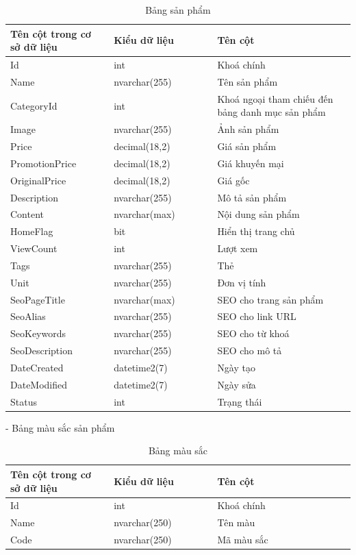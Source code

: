 \begin{longtable}[htp]{ |m{0.3\linewidth}|m{0.3\linewidth}|m{0.4\linewidth}|}
\caption{Bảng sản phẩm \label{database}}\\
 \hline
 Tên cột trong cơ sở dữ liệu & Kiểu dữ liệu & Tên cột  \\
 \hline
  Id&int&Khoá chính\\
 \hline
 Name&nvarchar(255)&Tên sản phẩm\\
 \hline
 CategoryId&int&Khoá ngoại tham chiếu đến bảng danh mục sản phẩm\\
 \hline
 Image&nvarchar(255)&Ảnh sản phẩm\\
 \hline 
 Price&decimal(18,2)&Giá sản phẩm\\
\hline
 PromotionPrice&decimal(18,2)&Giá khuyến mại\\
\hline
 OriginalPrice&decimal(18,2)&Giá gốc\\
 \hline
 Description&nvarchar(255)&Mô tả sản phẩm\\
 \hline
 Content&nvarchar(max)&Nội dung sản phẩm\\
 \hline
 HomeFlag&bit&Hiển thị trang chủ\\
 \hline
 ViewCount&int&Lượt xem\\
 \hline
 Tags&nvarchar(255)&Thẻ\\
 \hline
 Unit&nvarchar(255)&Đơn vị tính\\
 \hline
 SeoPageTitle&nvarchar(max)&SEO cho trang sản phẩm\\
 \hline
 SeoAlias&nvarchar(255)&SEO cho link URL\\
 \hline
 SeoKeywords&nvarchar(255)&SEO cho từ khoá\\
 \hline
 SeoDescription&nvarchar(255)&SEO cho mô tả \\
 \hline
 DateCreated&datetime2(7)&Ngày tạo\\
 \hline
 DateModified&datetime2(7)&Ngày sửa\\
 \hline
 Status&int&Trạng thái\\
 \hline
\end{longtable}
- Bảng màu sắc sản phẩm
\begin{longtable}[htp]{ |m{0.3\linewidth}|m{0.3\linewidth}|m{0.4\linewidth}|}
\caption{Bảng màu sắc \label{database}}\\
\hline
Tên cột trong cơ sở dữ liệu & Kiểu dữ liệu & Tên cột  \\
\hline
Id&int&Khoá chính\\
\hline
Name&nvarchar(250)&Tên màu\\
\hline
Code&nvarchar(250)&Mã màu sắc\\
\hline
\end{longtable}

